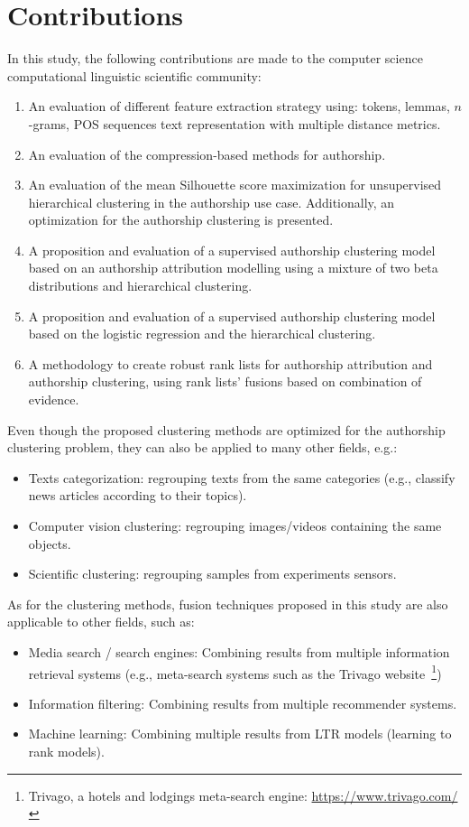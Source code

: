 \section{Contributions}

In this study, the following contributions are made to the computer science computational linguistic scientific community:

\begin{enumerate}
  \item
  An evaluation of different feature extraction strategy using: tokens, lemmas, $n$-grams, POS sequences text representation with multiple distance metrics.
  \item
  An evaluation of the compression-based methods for authorship.
  \item
  An evaluation of the mean Silhouette score maximization for unsupervised hierarchical clustering in the authorship use case. Additionally, an optimization for the authorship clustering is presented.
  \item
  A proposition and evaluation of a supervised authorship clustering model based on an authorship attribution modelling using a mixture of two beta distributions and hierarchical clustering.
  \item
  A proposition and evaluation of a supervised authorship clustering model based on the logistic regression and the hierarchical clustering.
  \item
  A methodology to create robust rank lists for authorship attribution and authorship clustering, using rank lists' fusions based on combination of evidence.
\end{enumerate}

Even though the proposed clustering methods are optimized for the authorship clustering problem, they can also be applied to many other fields, e.g.:
\begin{itemize}
  \item
  Texts categorization: regrouping texts from the same categories (e.g., classify news articles according to their topics).
  \item
  Computer vision clustering: regrouping images/videos containing the same objects.
  \item
  Scientific clustering: regrouping samples from experiments sensors.
\end{itemize}

As for the clustering methods, fusion techniques proposed in this study are also applicable to other fields, such as:
\begin{itemize}
  \item
  Media search / search engines: Combining results from multiple information retrieval systems (e.g., meta-search systems such as the Trivago website~\footnote{Trivago, a hotels and lodgings meta-search engine: \url{https://www.trivago.com/}})
  \item
  Information filtering: Combining results from multiple recommender systems.
  \item
  Machine learning: Combining multiple results from LTR models (learning to rank models).
\end{itemize}
